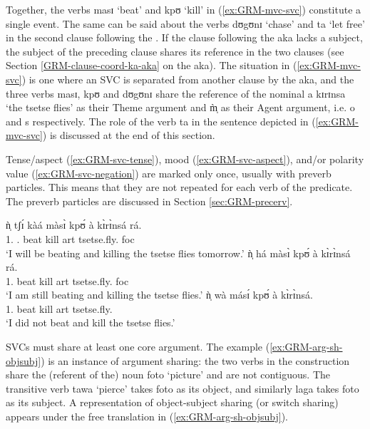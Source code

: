 Together,  the verbs {\sls masɪ} `beat' and  {\sls kpʊ} `kill'  in 
(\ref{ex:GRM-mvc-svc})  constitute a single event.  The same can be said about 
the verbs {\sls dʊgʊnɪ} `chase' and {\sls ta} `let free' in the second clause
following the .   If the clause following the    {\sls aka}
lacks a subject,  the subject of the preceding clause shares its reference in
the two clauses   (see Section \ref{GRM-clause-coord-ka-aka} on the  
{\sls aka}). The situation in (\ref{ex:GRM-mvc-svc}) is one where an SVC is separated from
another  clause by the  {\sls aka},  and the three verbs 
{\sls 
masɪ},  {\sls kpʊ} and {\sls dʊgʊnɪ}  share the reference of the  nominal {\sls 
a
kɪrɪnsa} `the tsetse flies' as their Theme argument and {\sls m̩̀} as their 
Agent
argument, i.e. {\sc o} and {\sc s} respectively. The role of  the verb {\sls ta}
in the sentence depicted in  (\ref{ex:GRM-mvc-svc}) is discussed at the end of
this section.

Tense/aspect (\ref{ex:GRM-svc-tense}), mood (\ref{ex:GRM-svc-aspect}), and/or
polarity value (\ref{ex:GRM-svc-negation}) are marked only once, usually with
preverb particles. This means that they are not repeated for each verb of the  predicate. The preverb particles are discussed in Section
\ref{sec:GRM-precerv}.


\ea\label{ex:GRM-svc-preverb}
 \ea\label{ex:GRM-svc-tense}{
\gll  ǹ̩ tʃɪ́ kàá màsɪ̀   kpʊ́   à  kɪ̀rɪ̀nsá rá.\\
{1.\sg} {\cras} {\fut.\prog}   beat   kill {\sc art} tsetse.fly.{\pl} {\sc foc} \\
\glt `I will be beating and killing the tsetse flies tomorrow.'
}
 \ex\label{ex:GRM-svc-aspect}{
\gll  ǹ̩  há màsɪ̀   kpʊ́   à  kɪ̀rɪ̀nsá rá.\\
  {1.\sg}  {\mod}   beat   kill {\sc art} tsetse.fly.{\pl} {\sc foc}\\
 \glt `I am still beating  and killing the tsetse flies.'
 }
 \ex\label{ex:GRM-svc-negation}{
\gll  ǹ̩   wà másɪ́   kpʊ́   à  kɪ̀rɪ̀nsá.\\
  {1.\sg}  {\neg}   beat   kill {\sc art} tsetse.fly.{\pl}\\
\glt `I did not beat and kill the tsetse flies.'
 }

\z 
 \z

SVCs must share at least one core  argument. The example 
(\ref{ex:GRM-arg-sh-objsubj}) is an instance of argument sharing: the two verbs
in the construction share the (referent of the) noun {\sls foto} `picture' and
are not contiguous. The
transitive verb {\sls tawa} `pierce' takes  {\sls foto} as its object, and similarly
{\sls laga} takes  {\sls foto} as its subject. A representation of 
object-subject
sharing (or switch sharing) appears under the free translation in
(\ref{ex:GRM-arg-sh-objsubj}).

